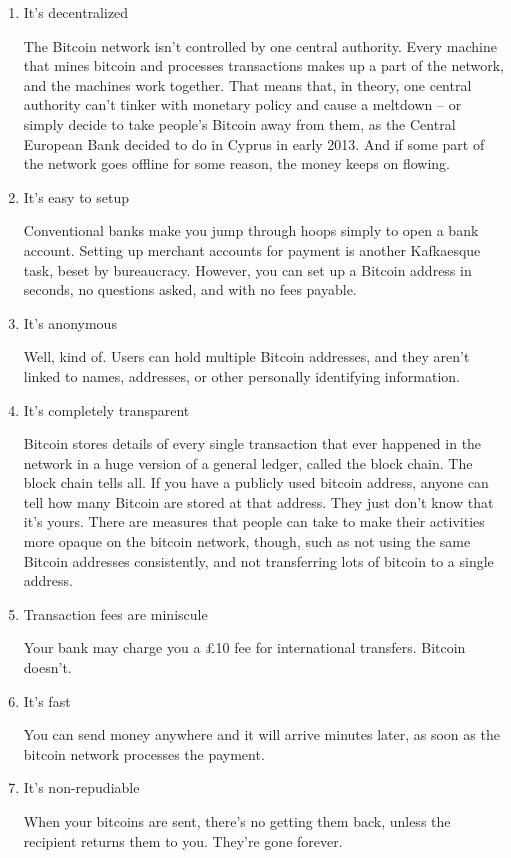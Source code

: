 \begin{enumerate}
	\item It’s decentralized
	
	The Bitcoin network isn’t controlled by one central authority. Every machine that mines bitcoin and
	processes transactions makes up a part of the network, and the machines work together. That means that, 
	in theory, one central authority can’t tinker with monetary policy and cause a meltdown – or simply 
	decide to take people’s Bitcoin away from them, as the Central European Bank decided to do in Cyprus in 
	early 2013. And if some part of the network goes offline for some reason, the money keeps on flowing.
	\item It's easy to setup

	Conventional banks make you jump through hoops simply to open a bank account. Setting up merchant
	accounts for payment is another Kafkaesque task, beset by bureaucracy. However, you can set up a
	Bitcoin address in seconds, no questions asked, and with no fees payable.

	\item It's anonymous

	Well, kind of. Users can hold multiple Bitcoin addresses, and they aren’t linked to names, addresses, or
	other personally identifying information.

	\item It's completely transparent

	Bitcoin stores details of every single transaction that ever happened in the network in a huge version 
	of a general ledger, called the block chain. The block chain tells all. If you have a publicly used bitcoin
	address, anyone can tell how many Bitcoin are stored at that address. They just don’t know that it’s yours.
	There are measures that people can take to make their activities more opaque on the bitcoin network,
	though, such as not using the same Bitcoin addresses consistently, and not transferring lots of bitcoin to a
	single address.

	\item Transaction fees are miniscule

	Your bank may charge you a £10 fee for international transfers. Bitcoin doesn’t.

	\item It's fast

	You can send money anywhere and it will arrive minutes later, as soon as the bitcoin network processes
	the payment.

	\item It's non-repudiable

	When your bitcoins are sent, there’s no getting them back, unless the recipient returns them to you.
	They’re gone forever.
\end{enumerate}

